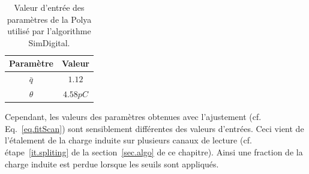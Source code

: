 \begin{table}[!ht]
  \begin{center}
    \begin{tabular}{c|c}
      Paramètre & Valeur\\
      \hline
      $\bar q$ & $1.12$\\
      $\theta$ & $4.58 pC$\\
    \end{tabular}
  \end{center}
  \caption{Valeur d'entrée des paramètres de la Polya utilisé par l'algorithme SimDigital.}
  \label{tab.inputPolya}
\end{table}
 Cependant, les valeurs des paramètres obtenues avec l'ajustement (cf. Eq.~\ref{eq.fitScan}) sont sensiblement différentes des valeurs d'entrées. Ceci vient de l'étalement de la charge induite sur plusieurs canaux de lecture (cf. étape~\ref{it.spliting} de la section~\ref{sec.algo} de ce chapitre). Ainsi une fraction de la charge induite est perdue lorsque les seuils sont appliqués.

